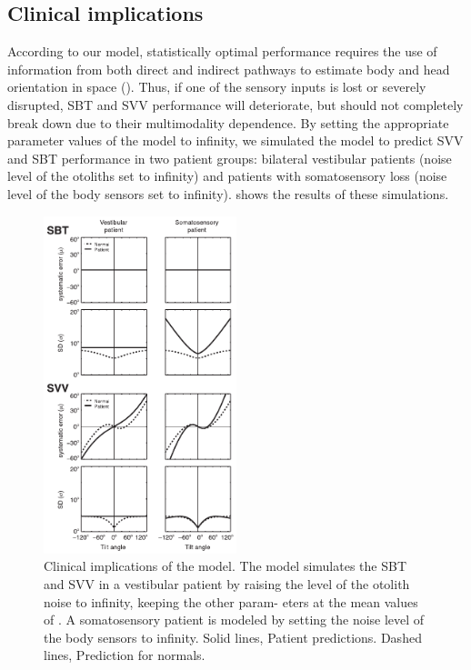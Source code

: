 \subsection{Clinical implications}
 
According to our model, statistically optimal performance requires the use of information from both direct and indirect pathways to estimate body and head orientation in space (). Thus, if one of the sensory inputs is lost or severely disrupted, SBT and SVV performance will deteriorate, but should not completely break down due to their multimodality dependence. By setting the appropriate parameter values of the model to infinity, we simulated the model to predict SVV and SBT performance in two patient groups: bilateral vestibular patients (noise level of the otoliths set to infinity) and patients with somatosensory loss (noise level of the body sensors set to infinity).  shows the results of these simulations. 

\begin{figure}
    \includegraphics[width=0.5\textwidth]{src/paper1/figure7.pdf}
    
    \caption{Clinical implications of the model. The model simulates the SBT and SVV in a vestibular patient by raising the level of the otolith noise to infinity, keeping the other param- eters at the mean values of . A somatosensory patient is modeled by setting the noise level of the body sensors to infinity. Solid lines, Patient predictions. Dashed lines, Prediction for normals.}
    \label{p1:fig7}
\end{figure}

